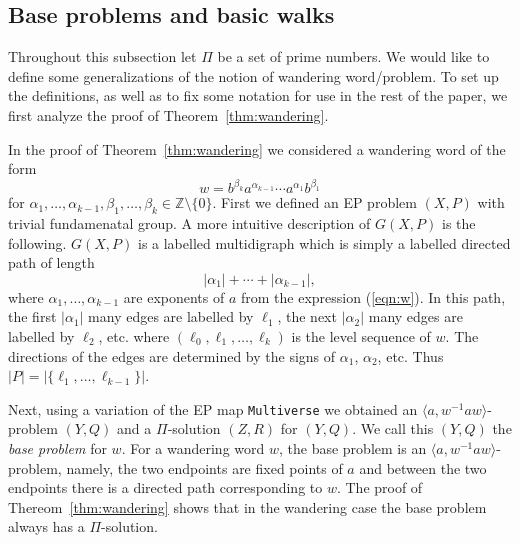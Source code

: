 \documentclass[11pt]{amsart}
\theoremstyle{definition}
\theoremstyle{definition}
\numberwithin{equation}{section}
\begin{document}
\subsection{Base problems and basic walks\label{subsec:baseproblem}}
Throughout this subsection let $\Pi$ be a set of prime numbers. We would like to define some generalizations of the notion of wandering word/problem. To set up the definitions, as well as to fix some notation for use in the rest of the paper, we first analyze the proof of Theorem~\ref{thm:wandering}.

In the proof of Theorem~\ref{thm:wandering} we considered a wandering word of the form 
\begin{equation}\label{eqn:w} w=b^{\beta_k}a^{\alpha_{k-1}}\cdots a^{\alpha_1}b^{\beta_1} \end{equation}
for $\alpha_1,\dots, \alpha_{k-1}, \beta_1,\dots, \beta_k\in\mathbb{Z}\setminus\{0\}$. 
First we defined an EP problem $(X, P)$ with trivial fundamenatal group. A more intuitive description of $G(X, P)$ is the following. $G(X, P)$ is a labelled multidigraph which is simply a labelled directed path of length 
$$ |\alpha_1|+\cdots+|\alpha_{k-1}|, $$
where $\alpha_1, \dots, \alpha_{k-1}$ are exponents of $a$ from the expression (\ref{eqn:w}). 
In this path, the first $|\alpha_1|$ many edges are labelled by $\ell_1$, the next $|\alpha_2|$ many edges are labelled by $\ell_2$, etc. where $(\ell_0, \ell_1, \dots, \ell_k)$ is the level sequence of $w$. The directions of the edges are determined by the signs of $\alpha_1$, $\alpha_2$, etc. Thus $|P|=|\{\ell_1,\dots, \ell_{k-1}\}|$. 

Next, using a variation of the EP map {\tt Multiverse} we obtained an $\langle a, w^{-1}aw\rangle$-problem $(Y, Q)$ and a $\Pi$-solution $(Z, R)$ for $(Y, Q)$. We call this $(Y,Q)$ the {\em base problem} for $w$. For a wandering word $w$, the base problem is an $\langle a, w^{-1}aw\rangle$-problem, namely, the two endpoints are fixed points of $a$ and between the two endpoints there is a directed path corresponding to $w$. The proof of Thereom~\ref{thm:wandering} shows that in the wandering case the base problem always has a $\Pi$-solution.
\end{document}

